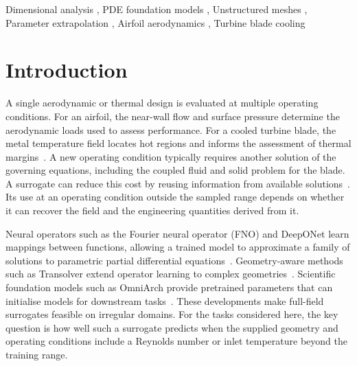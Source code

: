 \documentclass[a4paper,fleqn]{cas-sc}
\begin{document}
\begin{keywords}
Dimensional analysis \sep
PDE foundation models \sep
Unstructured meshes \sep
Parameter extrapolation \sep
Airfoil aerodynamics \sep
Turbine blade cooling
\end{keywords}

\maketitle

\section{Introduction}\label{sec:introduction}
\par

A single aerodynamic or thermal design is evaluated at multiple operating conditions.
For an airfoil, the near-wall flow and surface pressure determine the aerodynamic loads
used to assess performance. For a cooled turbine blade, the metal temperature field
locates hot regions and informs the assessment of thermal margins~\citep{Han2013}. A new operating
condition typically requires another solution of the governing equations, including
the coupled fluid and solid problem for the blade. A surrogate can reduce this cost
by reusing information from available solutions~\citep{Brunton2020,Benner2015}. Its use at an operating condition
outside the sampled range depends on whether it can recover the field and the
engineering quantities derived from it.

Neural operators such as the Fourier neural operator (FNO) and DeepONet learn mappings
between functions, allowing a trained model to approximate a family of solutions to
parametric partial differential equations~\citep{Li2021FNO,Lu2021DeepONet}. Geometry-aware methods such as Transolver
extend operator learning to complex geometries~\citep{Wu2024Transolver}. Scientific foundation models such
as OmniArch provide pretrained parameters that can initialise models for downstream
tasks~\citep{Chen2025OmniArch}. These developments make full-field surrogates feasible on irregular domains.
For the tasks considered here, the key question is how well such a surrogate predicts
when the supplied geometry and operating conditions include a Reynolds number or inlet
temperature beyond the training range.
\end{document}
